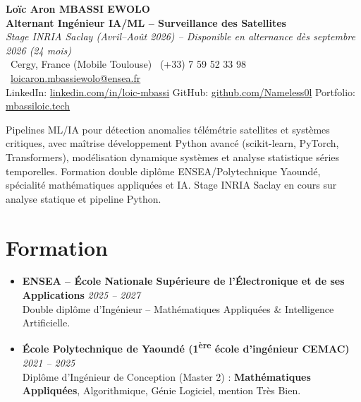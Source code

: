 \documentclass[a4paper,11pt]{article}
\begin{document}
\begin{center}
    {\Large \textbf{Lo\"ic Aron MBASSI EWOLO}} \\ \vspace{4pt}
    \textbf{\large Alternant Ing\'enieur IA/ML -- Surveillance des Satellites} \\
    \textit{\small Stage INRIA Saclay (Avril--Ao\^ut 2026) -- Disponible en alternance d\`es septembre 2026 (24 mois)} \\ \vspace{4pt}
    \small
    \Pointinghand\ Cergy, France (Mobile Toulouse) \quad \Mobilefone\ (+33) 7 59 52 33 98 \quad
    {\color{primary}\Letter\ \href{mailto:loicaron.mbassiewolo@ensea.fr}{loicaron.mbassiewolo@ensea.fr}} \\ \vspace{2pt}
    {\color{primary}LinkedIn: \href{https://www.linkedin.com/in/loic-mbassi/}{linkedin.com/in/loic-mbassi}} \quad
    {\color{primary}GitHub: \href{https://github.com/Nameless0l}{github.com/Nameless0l}} \quad
    {\color{primary}Portfolio: \href{https://mbassiloic.tech}{mbassiloic.tech}}
\end{center}
\vspace{-6pt}
\noindent\small{Pipelines ML/IA pour d\'etection anomalies t\'elém\'etrie satellites et systèmes critiques, avec maîtrise développement Python avanc\'e (scikit-learn, PyTorch, Transformers), modélisation dynamique syst\`emes et analyse statistique séries temporelles. Formation double diplôme ENSEA/Polytechnique Yaoundé, spécialité mathématiques appliquées et IA. Stage INRIA Saclay en cours sur analyse statique et pipeline Python.}

\section{Formation}
\begin{itemize}[leftmargin=*, label=\tiny$\bullet$, nosep]
    \item \textbf{ENSEA -- \'Ecole Nationale Sup\'erieure de l'\'Electronique et de ses Applications} \hfill \textit{2025 -- 2027} \\
    \small{Double dipl\^ome d'Ing\'enieur -- Math\'ematiques Appliqu\'ees \& Intelligence Artificielle.}
    \item \textbf{\'Ecole Polytechnique de Yaound\'e (1\textsuperscript{\`ere} \'ecole d'ing\'enieur CEMAC)} \hfill \textit{2021 -- 2025} \\
    \small{Dipl\^ome d'Ing\'enieur de Conception (Master 2) : \textbf{Math\'ematiques Appliqu\'ees}, Algorithmique, G\'enie Logiciel, mention Tr\`es Bien.}
\end{itemize}
\end{document}
